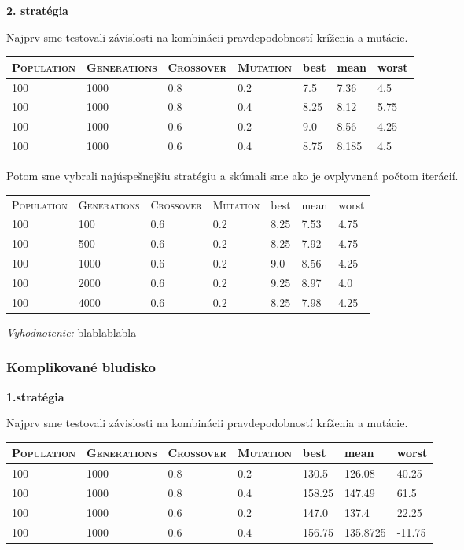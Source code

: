 \documentclass[10pt]{paper}
\begin{document}
\textbf{2. stratégia}

Najprv sme testovali závislosti na kombinácii pravdepodobností kríženia a mutácie.\\
\begin{center}
\begin{tabular}{|llll|lll|}
\hline
\textsc{Population} & \textsc{Generations} & \textsc{Crossover} & \textsc{Mutation}  & best & mean & worst \\ \hline
100 & 1000 & 0.8 & 0.2 & 7.5 & 7.36 & 4.5\\ 
100 & 1000 & 0.8 & 0.4 & 8.25 & 8.12 & 5.75\\
100 & 1000 & 0.6 & 0.2 & 9.0 & 8.56 & 4.25\\
100 & 1000 & 0.6 & 0.4 & 8.75 & 8.185 & 4.5\\ \hline
\end{tabular}
\end{center}

Potom sme vybrali najúspešnejšiu stratégiu a skúmali sme ako je ovplyvnená počtom iterácií.

\begin{center}
\begin{tabular}{|llll|lll|}
\hline
\textsc{Population} & \textsc{Generations} & \textsc{Crossover} & \textsc{Mutation}  & best & mean & worst \\
100 & 100 & 0.6 & 0.2 & 8.25 &  7.53 &  4.75 \\
100 & 500 & 0.6 & 0.2 & 8.25 & 7.92 & 4.75\\
100 & 1000 & 0.6 & 0.2 & 9.0 & 8.56 & 4.25\\ 
100 & 2000 & 0.6 & 0.2 & 9.25 & 8.97 & 4.0\\
100 & 4000 & 0.6 & 0.2 & 8.25 & 7.98 & 4.25\\ \hline
\end{tabular}
\end{center}

\textit{Vyhodnotenie:} blablablabla


\newpage 

\subsubsection{Komplikované bludisko}

\textbf{1.stratégia}

Najprv sme testovali závislosti na kombinácii pravdepodobností kríženia a mutácie.\\
\begin{center}
\begin{tabular}{|llll|lll|}
\hline
\textsc{Population} & \textsc{Generations} & \textsc{Crossover} & \textsc{Mutation}  & best & mean & worst \\ \hline

100 & 1000 & 0.8 & 0.2 & 130.5 & 126.08 & 40.25\\ 
100 & 1000 & 0.8 & 0.4 & 158.25 & 147.49 & 61.5\\
100 & 1000 & 0.6 & 0.2 & 147.0 & 137.4 & 22.25\\
100 & 1000 & 0.6 & 0.4 & 156.75 & 135.8725 & -11.75\\ \hline
\end{tabular}
\end{center}
\end{document}
